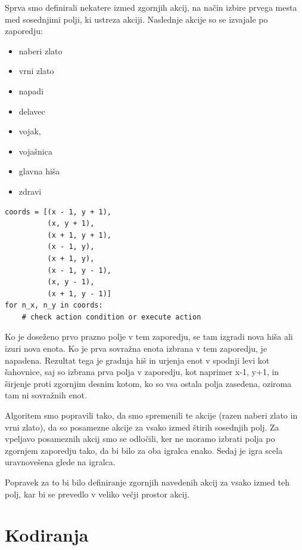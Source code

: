 \documentclass[a4paper, 12pt]{book}
\begin{document}
Sprva smo definirali nekatere izmed zgornjih akcij, na način izbire prvega mesta med sosednjimi polji, ki ustreza akciji. 
Naslednje akcije so se izvajale po zaporedju:
\begin{itemize}
	\item naberi zlato
	\item vrni zlato
	\item napadi
	\item delavec
	\item vojak, 
	\item vojašnica
	\item glavna hiša
	\item zdravi
\end{itemize}
\begin{verbatim}
coords = [(x - 1, y + 1),
          (x, y + 1),
          (x + 1, y + 1),
          (x - 1, y),
          (x + 1, y),
          (x - 1, y - 1),
          (x, y - 1),
          (x + 1, y - 1)]
for n_x, n_y in coords:
    # check action condition or execute action
\end{verbatim}
Ko je doseženo prvo prazno polje v tem zaporedju, se tam izgradi nova hiša ali izuri nova enota.
Ko je prva sovražna enota izbrana v tem zaporedju, je napadena.
Rezultat tega je gradnja hiš in urjenja enot v spodnji levi kot šahovnice, saj so izbrana prva polja v zaporedju, kot naprimer x-1, y+1, in širjenje proti zgornjim desnim kotom, ko so vsa ostala polja zasedena, oziroma tam ni sovražnih enot.

Algoritem smo popravili tako, da smo spremenili te akcije (razen naberi zlato in vrni zlato), da so posamezne akcije za vsako izmed štirih sosednjih polj.
Za vpeljavo posameznih akcij smo se odločili, ker ne moramo izbrati polja po zgornjem zaporedju tako, da bi bilo za oba igralca enako.
Sedaj je igra scela uravnovešena glede na igralca.

Popravek za to bi bilo definiranje zgornjih navedenih akcij za vsako izmed teh polj, kar bi se prevedlo v veliko večji prostor akcij.

\section{Kodiranja}
\end{document}
